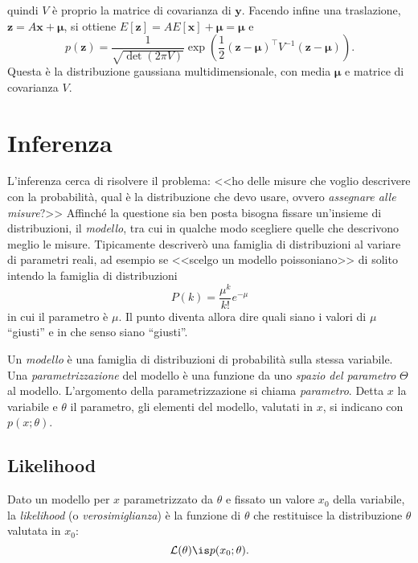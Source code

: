 %
quindi $V$ è proprio la matrice di covarianza di $\mathbf y$. Facendo infine
una traslazione, $\mathbf z = A\mathbf x + \boldsymbol\mu$, si ottiene
$E[\mathbf z] = AE[\mathbf x] + \boldsymbol\mu = \boldsymbol\mu$ e
%
\begin{equation*}
    p(\mathbf z) = \frac1{\sqrt{\det(2\pi V)}}
    \exp\left(\frac12 (\mathbf z - \boldsymbol\mu)^\top
    V^{-1} (\mathbf z - \boldsymbol\mu)\right).
\end{equation*}
%
Questa è la distribuzione gaussiana multidimensionale, con media
$\boldsymbol\mu$ e matrice di covarianza $V$. 

\chapter{Inferenza}
\label{sec:cap2}

L'inferenza cerca di risolvere il problema:
<<ho delle misure che voglio descrivere con la probabilità,
qual è la distribuzione che devo usare, ovvero \emph{assegnare alle misure}?>>
Affinché la questione sia ben posta bisogna fissare un'insieme di distribuzioni, il \emph{modello},
tra cui in qualche modo scegliere quelle che descrivono meglio le misure.
Tipicamente descriverò una famiglia di distribuzioni al variare di parametri reali,
ad esempio se <<scelgo un modello poissoniano>> di solito intendo la famiglia di distribuzioni
\begin{equation*}
	P(k) = \frac{\mu^k}{k!}e^{-\mu}
\end{equation*}
in cui il parametro è $\mu$.
Il punto diventa allora dire quali siano i valori di $\mu$ ``giusti'' e in che senso siano ``giusti''.

\begin{definition}[Modello]
	Un \emph{modello} è una famiglia di distribuzioni di probabilità sulla stessa variabile.
	Una \emph{parametrizzazione} del modello è una funzione
	da uno \emph{spazio del parametro} $\Theta$
	al modello.
	L'argomento della parametrizzazione si chiama \emph{parametro}.
	Detta $x$ la variabile e $\theta$ il parametro,
	gli elementi del modello, valutati in $x$, si indicano con $p(x;\theta)$.
\end{definition}

\section{Likelihood}

\begin{definition}[Likelihood]
	Dato un modello per $x$ parametrizzato da $\theta$
	e fissato un valore $x_0$ della variabile,
	la \emph{likelihood} (o \emph{verosimiglianza}) è la funzione di $\theta$
	che restituisce la distribuzione $\theta$ valutata in $x_0$:
	\begin{equation*}
		\mathcal L(\theta) \is p(x_0;\theta).
	\end{equation*}
\end{definition}

